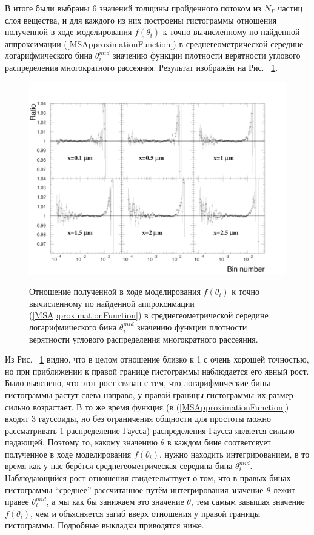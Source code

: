 \documentclass[a4paper,12pt]{article}
\begin{document}
\begin{large}
  В итоге были выбраны 6 значений толщины пройденного потоком из $N_P$ частиц слоя вещества, и для каждого из них построены гистограммы отношения полученной в ходе моделирования $f(\theta_i)$ к точно вычисленному по найденной аппроксимации (\ref{MSApproximationFunction}) в среднегеометрической середине логарифмического бина $\theta^{mid}_i$ значению функции плотности верятности углового распределения многократного рассеяния. Результат изображён на Рис. ~\ref{fig:MSRatioHistogramWithoutCorrection}.
\begin{figure}[ht]
{
   \includegraphics[width=0.99\linewidth]{images/ratioms_without_correction.pdf}
}
\caption{Отношение полученной в ходе моделирования $f(\theta_i)$ к точно вычисленному по найденной аппроксимации (\ref{MSApproximationFunction}) в среднегеометрической середине логарифмического бина $\theta^{mid}_i$ значению функции плотности верятности углового распределения многократного рассеяния.}
\label{fig:MSRatioHistogramWithoutCorrection}
\end{figure}

Из Рис. ~\ref{fig:MSRatioHistogramWithoutCorrection} видно, что в целом отношение близко к 1 с очень хорошей точностью, но при приближении к правой границе гистограммы наблюдается его явный рост. Было выяснено, что этот рост связан с тем, что логарифмические бины гистограммы растут слева направо, у правой границы гистограммы их размер сильно возрастает. В то же время функция (в (\ref{MSApproximationFunction}) входят 3 гауссоиды, но без ограничения общности для простоты можно рассматривать 1 распределение Гаусса) распределения Гаусса является сильно падающей. Поэтому то, какому значению $\theta$ в каждом бине соответсвует полученное в ходе моделирования $f(\theta_i)$, нужно находить интегрированием, в то время как у нас берётся среднегеометрическая середина бина $\theta^{mid}_i$. Наблюдающийся рост отношения свидетельствует о том, что в правых бинах гистограммы ``среднее'' рассчитанное путём интегрирования значение $\theta$ лежит правее $\theta^{mid}_i$, а мы как бы занижаем это значение $\theta$, тем самым завышая значение $f(\theta_i)$, чем и объясняется загиб вверх отношения у правой границы гистограммы. Подробные выкладки приводятся ниже.
  

\end{large}
\end{document}
